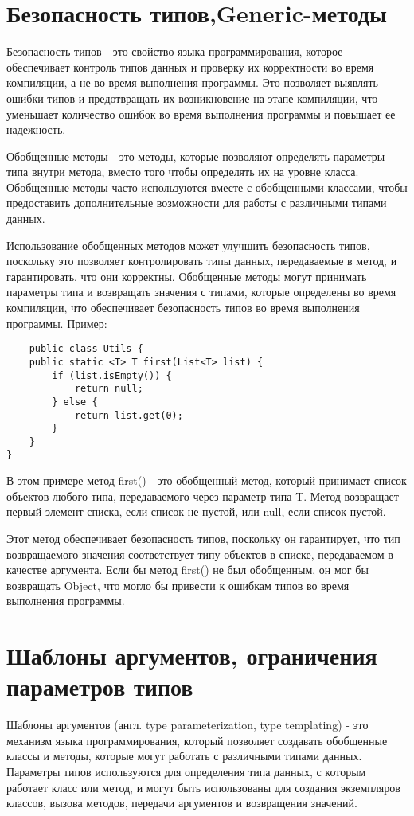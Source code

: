 \section{Безопасность типов,Generic-методы}
Безопасность типов - это свойство языка программирования, которое обеспечивает контроль типов данных и проверку их корректности во время компиляции, а не во время выполнения программы. Это позволяет выявлять ошибки типов и предотвращать их возникновение на этапе компиляции, что уменьшает количество ошибок во время выполнения программы и повышает ее надежность.

Обобщенные методы - это методы, которые позволяют определять параметры типа внутри метода, вместо того чтобы определять их на уровне класса. Обобщенные методы часто используются вместе с обобщенными классами, чтобы предоставить дополнительные возможности для работы с различными типами данных.

Использование обобщенных методов может улучшить безопасность типов, поскольку это позволяет контролировать типы данных, передаваемые в метод, и гарантировать, что они корректны. Обобщенные методы могут принимать параметры типа и возвращать значения с типами, которые определены во время компиляции, что обеспечивает безопасность типов во время выполнения программы.
Пример:
\begin{lstlisting}
    public class Utils {
    public static <T> T first(List<T> list) {
        if (list.isEmpty()) {
            return null;
        } else {
            return list.get(0);
        }
    }
}
\end{lstlisting}
В этом примере метод first() - это обобщенный метод, который принимает список объектов любого типа, передаваемого через параметр типа T. Метод возвращает первый элемент списка, если список не пустой, или null, если список пустой.

Этот метод обеспечивает безопасность типов, поскольку он гарантирует, что тип возвращаемого значения соответствует типу объектов в списке, передаваемом в качестве аргумента. Если бы метод first() не был обобщенным, он мог бы возвращать Object, что могло бы привести к ошибкам типов во время выполнения программы.

\section{Шаблоны аргументов, ограничения параметров типов}
Шаблоны аргументов (англ. type parameterization, type templating) - это механизм языка программирования, который позволяет создавать обобщенные классы и методы, которые могут работать с различными типами данных. Параметры типов используются для определения типа данных, с которым работает класс или метод, и могут быть использованы для создания экземпляров классов, вызова методов, передачи аргументов и возвращения значений.

